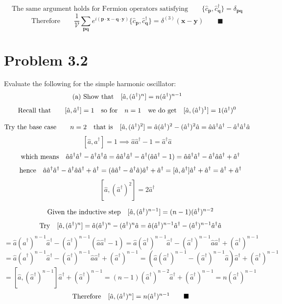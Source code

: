\documentclass{amsart}
\begin{document}
\[\text{The same argument holds for Fermion operators satisfying}\qquad\{\hat{c}_{\boldsymbol{p}},\hat{c}^\dagger_{\boldsymbol{q}}\}  = \delta_{\boldsymbol{pq}}  \]
\[\text{Therefore}\qquad\frac{1}{\mathcal{V}}\sum_{\boldsymbol{pq}}e^{i(\boldsymbol{p\cdot x}-\boldsymbol{q\cdot y})}\{\hat{c}_{\boldsymbol{p}},\hat{c}^\dagger_{\boldsymbol{q}}\}=\delta^{(3)} (\boldsymbol{x}-\boldsymbol{y})\qquad\blacksquare\]

\section*{Problem 3.2}
Evaluate the following for the simple harmonic oscillator:
\[\qq*{(a) Show that}[\hat{a},(\hat{a}^\dagger)^n]= n(\hat{a}^\dagger)^{n-1}  \]
\[\text{Recall that}\qquad[\hat{a},\hat{a}^\dagger] = 1\qq{so for}n=1\qq{we do get}[\hat{a},(\hat{a}^\dagger)^1] =1(\hat{a}^\dagger)^0 \]

\[\text{Try the base case}\qquad n=2\qq{that is}[\hat{a},(\hat{a}^\dagger)^2] = \hat{a}(\hat{a}^\dagger)^2-(\hat{a}^\dagger)^2 \hat{a} = \hat{a}\hat{a}^\dagger \hat{a}^\dagger-\hat{a}^\dagger \hat{a}^\dagger \hat{a}   \]
\[[\hat{a},\hat{a}^\dagger] = 1 \implies \hat{a}\hat{a}^\dagger -1 =  \hat{a}^\dagger \hat{a}\]
\[\qq{which means}\hat{a}\hat{a}^\dagger \hat{a}^\dagger-\hat{a}^\dagger \hat{a}^\dagger \hat{a} =\hat{a}\hat{a}^\dagger \hat{a}^\dagger-\hat{a}^\dagger (\hat{a}\hat{a}^\dagger -1 ) =\hat{a}\hat{a}^\dagger \hat{a}^\dagger-\hat{a}^\dagger \hat{a}\hat{a}^\dagger +\hat{a}^\dagger\]
\[\qq{hence}\hat{a}\hat{a}^\dagger \hat{a}^\dagger-\hat{a}^\dagger \hat{a}\hat{a}^\dagger +\hat{a}^\dagger=(\hat{a}\hat{a}^\dagger -\hat{a}^\dagger \hat{a})\hat{a}^\dagger +\hat{a}^\dagger   =[\hat{a},\hat{a}^\dagger] \hat{a}^\dagger +\hat{a}^\dagger  = \hat{a}^\dagger +\hat{a}^\dagger \]
\[ [\hat{a},(\hat{a}^\dagger)^2]   =2\hat{a}^\dagger \]

\[\qq{Given the inductive step}[\hat{a},(\hat{a}^\dagger)^{n-1}] =(n-1)(\hat{a}^\dagger)^{n-2} \]
\[\qq{Try}[\hat{a},(\hat{a}^\dagger)^n]=\hat{a}(\hat{a}^\dagger)^n-(\hat{a}^\dagger)^n \hat{a}=\hat{a}(\hat{a}^\dagger)^{n-1}\hat{a}^\dagger-(\hat{a}^\dagger)^{n-1}\hat{a}^\dagger \hat{a}\]
\[=\hat{a}(\hat{a}^\dagger)^{n-1}\hat{a}^\dagger-(\hat{a}^\dagger)^{n-1}(\hat{a}\hat{a}^\dagger -1 )=\hat{a}(\hat{a}^\dagger)^{n-1}\hat{a}^\dagger-(\hat{a}^\dagger)^{n-1}\hat{a}\hat{a}^\dagger +(\hat{a}^\dagger)^{n-1}\]
\[=\hat{a}(\hat{a}^\dagger)^{n-1}\hat{a}^\dagger-(\hat{a}^\dagger)^{n-1}\hat{a}\hat{a}^\dagger +(\hat{a}^\dagger)^{n-1}=(\hat{a}(\hat{a}^\dagger)^{n-1}-(\hat{a}^\dagger)^{n-1}\hat{a})\hat{a}^\dagger +(\hat{a}^\dagger)^{n-1}\]
\[=[\hat{a},(\hat{a}^\dagger)^{n-1}]\hat{a}^\dagger +(\hat{a}^\dagger)^{n-1}=(n-1)(\hat{a}^\dagger)^{n-2}\hat{a}^\dagger+(\hat{a}^\dagger)^{n-1}=n(\hat{a}^\dagger)^{n-1}\]
\[\qq{Therefore}[\hat{a},(\hat{a}^\dagger)^n]=n(\hat{a}^\dagger)^{n-1}\qquad\blacksquare\]
\end{document}
